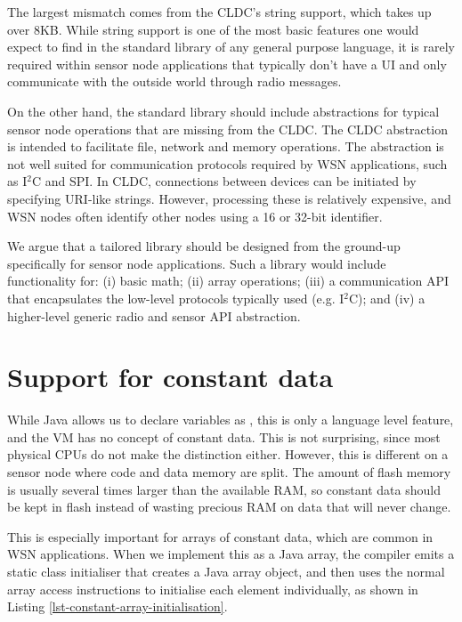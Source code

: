 The largest mismatch comes from the CLDC's string support, which takes up over 8KB. While string support is one of the most basic features one would expect to find in the standard library of any general purpose language, it is rarely required within sensor node applications that typically don't have a UI and only communicate with the outside world through radio messages.

On the other hand, the standard library should include abstractions for typical sensor node operations that are missing from the CLDC. The CLDC  abstraction is intended to facilitate file, network and memory operations. The abstraction is not well suited for communication protocols required by WSN applications, such as I$^{2}$C and SPI. In CLDC, connections between devices can be initiated by specifying URI-like strings. However, processing these is relatively expensive, and WSN nodes often identify other nodes using a 16 or 32-bit identifier.

We argue that a tailored library should be designed from the ground-up specifically for sensor node applications. Such a library would include functionality for: (i) basic math; (ii) array operations; (iii) a communication API that encapsulates the low-level protocols typically used (e.g. I$^{2}$C); and (iv) a higher-level generic radio and sensor API abstraction.




\section{Support for constant data}
\label{sec-const-data}
While Java allows us to declare variables as , this is only a language level feature, and the VM has no concept of constant data. This is not surprising, since most physical CPUs do not make the distinction either. However, this is different on a sensor node where code and data memory are split. The amount of flash memory is usually several times larger than the available RAM, so constant data should be kept in flash instead of wasting precious RAM on data that will never change.

This is especially important for arrays of constant data, which are common in WSN applications. When we implement this as a  Java array, the compiler emits a static class initialiser that creates a Java array object, and then uses the normal array access instructions to initialise each element individually, as shown in Listing \ref{lst-constant-array-initialisation}.

